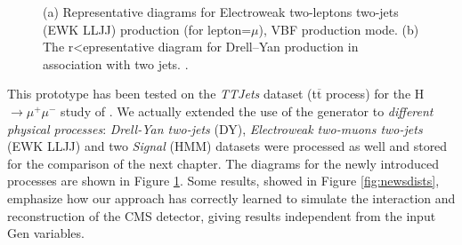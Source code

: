 \begin{figure}
    \myfloatalign
    \caption[EWK LLJJ and DY diagrams]{ (a) Representative diagrams for Electroweak two-leptons two-jets (EWK LLJJ) production (for lepton=$\mu$), VBF production mode. (b) The  r<epresentative diagram for Drell–Yan production in association with two jets. .}\label{fig:newdiag}
    
\end{figure}

This prototype has been tested on the \emph{TTJets} dataset (t$\overline{\text{t}}$ process) for the H$\rightarrow\mu^+\mu^-$ study of \cite{Sirunyan_2021}. We actually extended the use of the generator to \emph{different physical processes}: \emph{Drell-Yan two-jets} (DY), \emph{Electroweak two-muons two-jets} (EWK LLJJ) and two \emph{Signal} (HMM) datasets were processed as well and stored for the comparison of the next chapter. The diagrams for the newly introduced processes are shown in Figure \ref{fig:newdiag}. Some results, showed in Figure \ref{fig:newsdists}, emphasize how our approach has correctly learned to simulate the interaction and reconstruction of the CMS detector, giving results independent from the input Gen variables.

